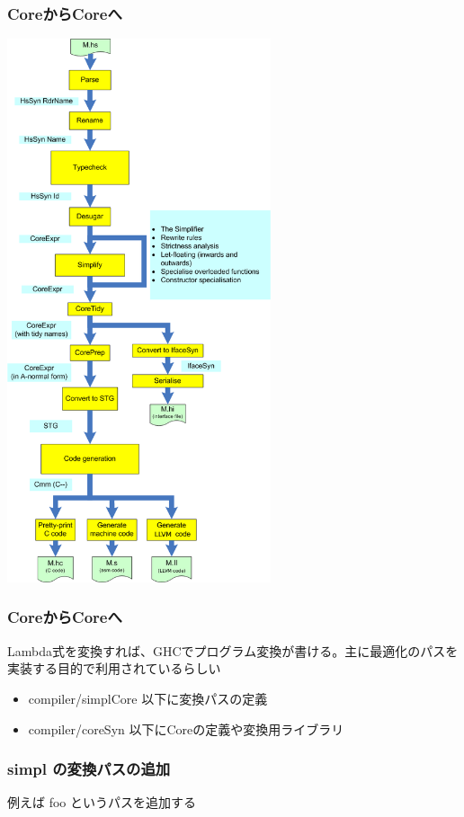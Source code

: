 \documentclass[cjk,dvipdfm,14pt]{beamer}
\begin{document}
\begin{frame}[fragile]
\frametitle{CoreからCoreへ}

\includegraphics[height=16cm]{./HscPipe2.png}

\end{frame}





\begin{frame}[fragile]
\frametitle{CoreからCoreへ}

Lambda式を変換すれば、GHCでプログラム変換が書ける。主に最適化のパスを実装する目的で利用されているらしい
\begin{itemize}
\item compiler/simplCore 以下に変換パスの定義
\item compiler/coreSyn 以下にCoreの定義や変換用ライブラリ
\end{itemize}

\end{frame}

\begin{frame}[fragile]
\frametitle{simpl の変換パスの追加}

例えば foo というパスを追加する

\hrulefill

\end{frame}
\end{document}
